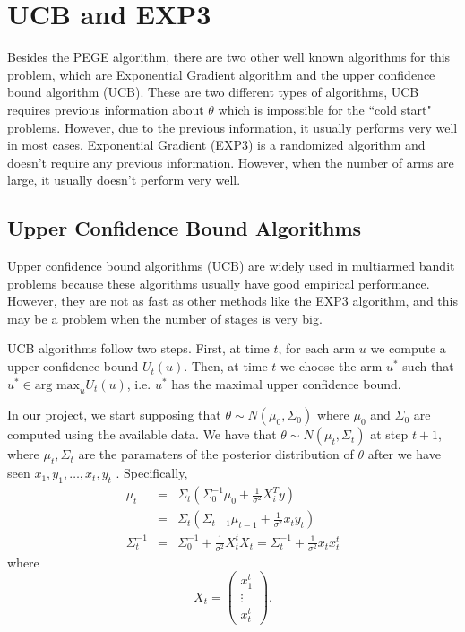 \documentclass{article}
\theoremstyle{plain}
\theoremstyle{definition}
\begin{document}
\section{UCB and EXP3}
Besides the PEGE algorithm, there are two other well known algorithms for this problem, which are Exponential Gradient algorithm and the upper confidence bound algorithm (UCB). These are two different types of algorithms, UCB requires previous information about $\theta$ which is impossible for the ``cold start" problems. However, due to the previous information, it usually performs very well in most cases. Exponential Gradient (EXP3) is a randomized algorithm and doesn't require any previous information. However, when the number of arms are large, it usually doesn't perform very well.



\subsection{Upper Confidence Bound Algorithms}

Upper confidence bound algorithms (UCB) are widely used in multiarmed
bandit problems because these algorithms usually have good empirical performance. 
However, they are not as fast as other methods like the EXP3 algorithm, and this may be a problem
when the number of stages is very big.

UCB algorithms follow two steps. First, at time $t$, for each arm
$u$ we compute a upper confidence bound $U_{t}\left(u\right)$. Then,
at time $t$ we choose the arm $u^{*}$ such that $u^{*}\in\mbox{arg max}_{u}U_{t}\left(u\right)$,
i.e. $u^{*}$ has the maximal upper confidence bound. 

In our project, we start supposing that $\theta\sim N\left(\mu_{0},\Sigma_{0}\right)$
where $\mu_{0}$ and $\Sigma_{0}$ are computed using the available
data. We have that $\theta\sim N\left(\mu_{t},\Sigma_{t}\right)$
at step $t+1$, where $\mu_{t},\Sigma_{t}$ are the paramaters of
the posterior distribution of $\theta$ after we have seen $x_{1},y_{1},\ldots,x_{t},y_{t}$
. Specifically,
\begin{eqnarray*}
\mu_{t} & = & \Sigma_{t}\left(\Sigma_{0}^{-1}\mu_{0}+\frac{1}{\sigma^{2}}X_{i}^{T}y\right)\\
 & = & \Sigma_{t}\left(\Sigma_{t-1}\mu_{t-1}+\frac{1}{\sigma^{2}}x_{t}y_{t}\right)\\
\Sigma_{t}^{-1} & = & \Sigma_{0}^{-1}+\frac{1}{\sigma^{2}}X_{t}^{t}X_{t}=\Sigma_{t}^{-1}+\frac{1}{\sigma^{2}}x_{t}x_{t}^{t}
\end{eqnarray*}
where 
\[
X_{t}=\left(\begin{array}{c}
x_{1}^{t}\\
\vdots\\
x_{t}^{t}
\end{array}\right).
\]
\end{document}
